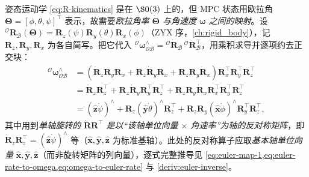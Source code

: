 姿态运动学 \cref{eq:R-kinematics} 是在 $\SO(3)$ 上的，但 MPC 状态用欧拉角 $\boldsymbol{\Theta}=[\phi,\theta,\psi]^\top$ 表示，故需要\emph{欧拉角率 $\dot{\boldsymbol{\Theta}}$ 与角速度 $\boldsymbol{\omega}$ 之间的映射}。设 ${}^{\mathcal{O}}\mathbf{R}_{\mathcal{B}}(\boldsymbol{\Theta})=\mathbf{R}_z(\psi)\mathbf{R}_y(\theta)\mathbf{R}_x(\phi)$（ZYX 序，\cref{ch:rigid_body}），记 $\mathbf{R}_z,\mathbf{R}_y,\mathbf{R}_x$ 为各自简写。把它代入 ${}^{\mathcal{O}}\boldsymbol{\omega}_{\mathcal{OB}}^{\wedge}={}^{\mathcal{O}}\dot{\mathbf{R}}_{\mathcal{B}}\,{}^{\mathcal{O}}\mathbf{R}_{\mathcal{B}}^\top$，用乘积求导并逐项约去正交块\cite{yu2021quadruped}：
\begin{equation}
\begin{aligned}
  {}^{\mathcal{O}}\boldsymbol{\omega}_{\mathcal{OB}}^{\wedge}
  &=\left(\dot{\mathbf{R}}_z\mathbf{R}_y\mathbf{R}_x+\mathbf{R}_z\dot{\mathbf{R}}_y\mathbf{R}_x+\mathbf{R}_z\mathbf{R}_y\dot{\mathbf{R}}_x\right)\mathbf{R}_x^\top\mathbf{R}_y^\top\mathbf{R}_z^\top\\
  &=\dot{\mathbf{R}}_z\mathbf{R}_z^\top+\mathbf{R}_z\dot{\mathbf{R}}_y\mathbf{R}_y^\top\mathbf{R}_z^\top+\mathbf{R}_z\mathbf{R}_y\dot{\mathbf{R}}_x\mathbf{R}_x^\top\mathbf{R}_y^\top\mathbf{R}_z^\top\\
  &=(\hat{\mathbf{z}}\dot{\psi})^{\wedge}+\mathbf{R}_z(\hat{\mathbf{y}}\dot{\theta})^{\wedge}\mathbf{R}_z^\top+\mathbf{R}_z\mathbf{R}_y(\hat{\mathbf{x}}\dot{\phi})^{\wedge}\mathbf{R}_y^\top\mathbf{R}_z^\top,
\end{aligned}
\label{eq:euler-map-1}
\end{equation}
其中用到\emph{单轴旋转的 $\dot{\mathbf{R}}\mathbf{R}^\top$ 是以“该轴单位向量 $\times$ 角速率”为轴的反对称矩阵}，即 $\dot{\mathbf{R}}_z\mathbf{R}_z^\top=(\hat{\mathbf{z}}\dot{\psi})^{\wedge}$ 等（$\hat{\mathbf{x}},\hat{\mathbf{y}},\hat{\mathbf{z}}$ 为标准基轴）。此处的反对称算子应取\emph{基本轴单位向量} $\hat{\mathbf{x}},\hat{\mathbf{y}},\hat{\mathbf{z}}$（而非旋转矩阵的列向量），逐式完整推导见 \cref{eq:euler-map-1,eq:euler-rate-to-omega,eq:omega-to-euler-rate} 与 \cref{deriv:euler-inverse}。

